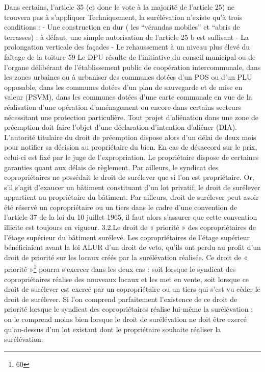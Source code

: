 	Dans certains, l’article 35 (et donc le vote à la majorité de l’article 25) ne trouvera pas à s’appliquer
	Techniquement, la surélévation n’existe qu’à trois conditions :
	- Une construction en dur ( les “vérandas mobiles” et “abris de terrasses) : à défaut, une simple autorisation de l’article 25 b est suffisant
	- La prolongation verticale des façades
	- Le rehaussement à un niveau plus élevé du faîtage de la toiture
	59 Le DPU résulte de l’initiative du conseil municipal ou de l’organe délibérant de l’établissement public de coopération intercommunale, dans les zones urbaines ou à urbaniser des communes dotées d’un POS ou d’un PLU opposable, dans les communes dotées d’un plan de sauvegarde et de mise en valeur (PSVM), dans les communes dotées d’une carte communale en vue de la réalisation d’une opération d’aménagement ou encore dans certains secteurs nécessitant une protection particulière.
	Tout projet d’aliénation dans une zone de préemption doit faire l’objet d’une déclaration d’intention d’aliéner (DIA). L’autorité titulaire du droit de préemption dispose alors d’un délai de deux mois pour notifier sa décision au propriétaire du bien. En cas de désaccord sur le prix, celui-ci est fixé par le juge de l’expropriation. Le propriétaire dispose de certaines garanties quant aux délais de règlement.
	Par ailleurs, le syndicat des copropriétaires ne possédait le droit de surélever que si l'on est propriétaire. Or, s'il s'agit d'exaucer un bâtiment constituant d'un lot privatif, le droit de surélever appartient au propriétaire du bâtiment. Par ailleurs, droit de surélever peut avoir été réservé un copropriétaire ou un tiers dans le cadre d'une convention de l'article 37 de la loi du 10 juillet 1965, il faut alors s'assurer que cette convention illicite est toujours en vigueur.
	3.2.Le droit de « priorité » des copropriétaires de l’étage supérieur du bâtiment surélevé.
	Les copropriétaires de l’étage supérieur bénéficiaient avant la loi ALUR d’un droit de veto, qu’ils ont perdu au profit d’un droit de priorité sur les locaux créés par la surélévation réalisée.
	Ce droit de « priorité »\footnote{60} pourra s’exercer dans les deux cas : soit lorsque le syndicat des copropriétaires réalise des nouveaux locaux et les met en vente, soit lorsque ce droit de surélever est exercé par un copropriétaire ou un tiers qui s’est vu céder le droit de surélever.
	Si l’on comprend parfaitement l’existence de ce droit de priorité lorsque le syndicat des copropriétaires réalise lui-même la surélévation ; on le comprend moins bien lorsque le droit de surélévation ne doit être exercé qu’au-dessus d’un lot existant dont le propriétaire souhaite réaliser la surélévation.
